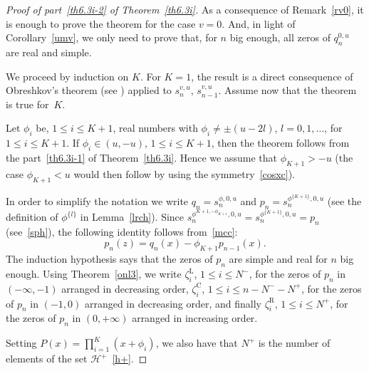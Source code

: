 \documentclass[10pt, a4paper, leqno]{amsart}
\numberwithin{equation}{section}
\theoremstyle{plain}
\theoremstyle{remark}
\newcommand{\Hh}{\mathcal{H}}
\newcommand{\Ll}{\mathrm{L}}
\newcommand{\C}{\mathrm{C}}
\newcommand{\R}{\mathrm{R}}
\newcommand{\scvu}{s^{v,u}}
\begin{document}
\begin{proof}[Proof of part~\eqref{th6.3i-2} of Theorem~\ref{th6.3i}]
As a consequence of Remark~\ref{rv0}, it is enough to prove the theorem for the case $v=0$. And, in light of Corollary~\ref{umv}, we only need to prove that, for $n$ big enough, all zeros of $q_n^{0,u}$ are real and simple.

We proceed by induction on $K$.
For $K=1$, the result is a direct consequence of Obreshkov's theorem (see \cite[p.~9]{Hou}) applied to $\scvu_n$, $\scvu_{n-1}$. Assume now that the theorem is true for~$K$.

Let $\phi_i$ be, $1\le i\le K+1$, real numbers with $\phi_i \ne \pm(u-2l)$, $l=0,1,\dots$, for $1\le i\le K+1$. If $\phi_i\in (u,-u)$, $1\le i\le K+1$, then the theorem follows from the part~\eqref{th6.3i-1} of Theorem~\ref{th6.3i}. Hence we assume that $\phi_{K+1}>-u$ (the case $\phi_{K+1}<u$ would then follow by using the symmetry~\eqref{cosxc}).

In order to simplify the notation we write $q_n=s_n^{\phi,0,u}$ and $p_n=s_n^{\phi^{\{K+1\}},0,u}$ (see the definition of $\phi^{\{l\}}$ in Lemma~\ref{lrch}).
Since $s_n^{\phi^{K+1,-\phi_{K+1}},0,u} = s_n^{\phi^{\{K+1\}},0,u} = p_n$ (see~\eqref{sph}), the following identity follows from~\eqref{mcc}:
\begin{equation}
\label{pmi}
  p_n(z) = q_n(x)-\phi_{K+1}p_{n-1}(x).
\end{equation}
The induction hypothesis says that the zeros of $p_n$ are simple and real for $n$ big enough. Using Theorem~\ref{onl3}, we write $\zeta_i^{\Ll}$, $1\le i \le N^-$, for the zeros of $p_n$ in $(-\infty,-1)$ arranged in decreasing order, $\zeta_i^{\C}$, $1\le i \le n-N^- - N^+$, for the zeros of $p_n$ in $(-1,0)$ arranged in decreasing order, and finally $\zeta_i^{\R}$, $1\le i\le N^+$, for the zeros of $p_n$ in $(0,+\infty)$ arranged in increasing order.

Setting $P(x) = \prod_{i=1}^K(x+\phi_i)$, we also have that $N^+$ is the number of elements of the set $\Hh^+$~\eqref{h+}.


\end{proof}
\end{document}
